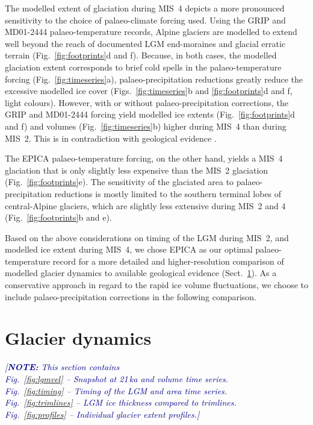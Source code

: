 \documentclass[tc, manuscript]{copernicus}
\newcommand{\note}[1]{\textcolor{darkblue}{\emph{[\textbf{NOTE:} #1]}}}
\begin{document}
    The modelled extent of glaciation during MIS~4 depicts a more pronounced
    sensitivity to the choice of palaeo-climate forcing used. Using the GRIP
    and MD01-2444 palaeo-temperature records, Alpine glaciers are modelled to
    extend well beyond the reach of documented LGM end-moraines and glacial
    erratic terrain (Fig.~\ref{fig:footprints}d and f). Because, in both cases,
    the modelled glaciation extent corresponds to brief cold spells in the
    palaeo-temperature forcing (Fig.~\ref{fig:timeseries}a),
    palaeo-precipitation reductions greatly reduce the excessive modelled ice
    cover (Figs.~\ref{fig:timeseries}b and \ref{fig:footprints}d and f, light
    colours). However, with or without palaeo-precipitation corrections,
    the GRIP and MD01-2444 forcing yield
    modelled ice extents (Fig.~\ref{fig:footprints}d and f) and volumes
    (Fig.~\ref{fig:timeseries}b) higher during MIS~4 than
    during MIS~2. This is in contradiction with geological evidence
    \citep{Preusser.2004, Ivy-Ochs.etal.2008}.

    The EPICA palaeo-temperature forcing, on the other hand, yields a MIS~4
    glaciation that is only slightly less expensive than the MIS~2 glaciation
    (Fig.~\ref{fig:footprints}e). The sensitivity of the glaciated area to
    palaeo-precipitation reductions is mostly limited to the southern terminal
    lobes of central-Alpine glaciers, which are slightly less extensive during
    MIS~2 and 4 (Fig.~\ref{fig:footprints}b and e).

    Based on the above considerations on timing of the LGM during MIS~2, and
    modelled ice
    extent during MIS~4, we chose EPICA as our optimal palaeo-temperature
    record for a more detailed and higher-resolution comparison of modelled
    glacier dynamics to available geological evidence
    (Sect.~\ref{sec:results}). As a conservative approach in regard to the
    rapid ice volume fluctuations, we choose to include palaeo-precipitation
    corrections in the following comparison.


\section{Glacier dynamics}
\label{sec:results}

    \note{This section contains\\
        Fig.~\ref{fig:lgmvel} -- Snapshot at 21\,ka and volume time series.\\
        Fig.~\ref{fig:timing} -- Timing of the LGM and area time series.\\
        Fig.~\ref{fig:trimlines} -- LGM ice thickness compared to trimlines.\\
        Fig.~\ref{fig:profiles} -- Individual glacier extent profiles.}
\end{document}
